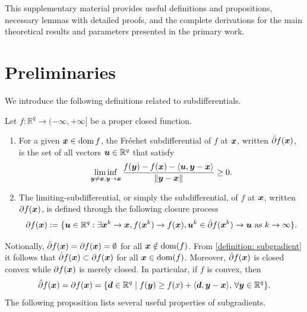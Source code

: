 This supplementary material provides useful definitions and propositions, necessary lemmas with detailed proofs, and the complete derivations for the main theoretical results and parameters presented in the primary work.
\section{Preliminaries}
\label{Appendix: Preliminaries and notations}
We introduce the following definitions related to subdifferentials.
\begin{definition}
    \label{definition: subgradient} Let $f : \mathbb{R}^{q}\to (-\infty, +\infty
    ]$ be a proper closed function.
    \begin{enumerate}[label=(\roman{*})]
        \item For a given $\bm{x} \in \operatorname{dom}f$, the Fréchet
            subdifferential of $f$ at $\bm{x}$, written
            $\hat{\partial}f(\bm{x})$, is the set of all vectors $\bm{u} \in \mathbb{R}
            ^{q}$ that satisfy
            \[
                \liminf_{\bm{y} \neq \bm{x}, \bm{y} \to \bm{x}}\frac{f(\bm{y}) - f(\bm{x}) -
                \langle \bm{u}, \bm{y} - \bm{x} \rangle}{\|\bm{y} - \bm{x}\|}\geq 0.
            \]

        \item The limiting-subdifferential, or simply the subdifferential, of $f$
            at $\bm{x}$, written $\partial f(\bm{x})$, is defined through the following
            closure process
\[
\partial f(\bm{x}) := \{ \bm{u} \in \mathbb{R}^{q}: \exists \bm{x}^{k}\to \bm{x}, f(\bm{x}^{k}) \to f(\bm{x}), \bm{u}^{k}\in \hat{\partial}f(\bm{x}^{k}) \to \bm{u} \text{ as }k \to \infty \}.
\]
    \end{enumerate}
\end{definition}
Notionally, $\hat{\partial}f(\bm{x}) = \partial f(\bm{x}) = \emptyset$ for all $\bm{x} \notin
\operatorname{dom}(f)$. From \cref{definition: subgradient} it
follows that $\hat{\partial}f(\bm{x}) \subset \partial f(\bm{x})$ for all
$\bm{x} \in \operatorname{dom}(f)$. Moreover, $\hat{\partial}f(\bm{x})$ is closed
convex while $\partial f(\bm{x})$ is merely closed. In particular, if $f$ is convex,
then
\[
    \hat{\partial}f(\bm{x}) = \partial f(\bm{x}) = \{ \bm{d} \in \mathbb{R}^{q}\mid f(\bm{y}
    ) \geq f(x) + \langle \bm{d}, \bm{y} - \bm{x} \rangle ,\,\forall \bm{y} \in \mathbb{R}
    ^{q}\}.
\]
The following proposition lists several useful properties of subgradients.

